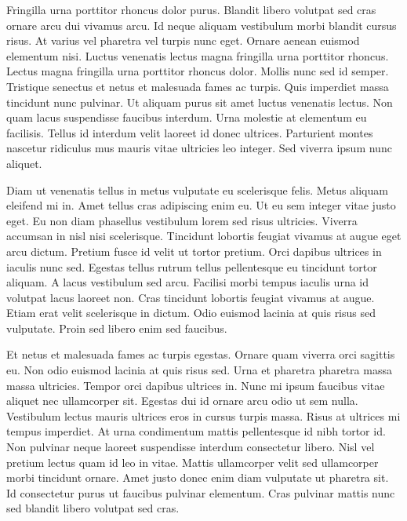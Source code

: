 \documentclass[11pt,a4paper]{article}
\begin{document}
Fringilla urna porttitor rhoncus dolor purus. Blandit libero volutpat sed cras ornare arcu dui vivamus arcu. Id neque aliquam vestibulum morbi blandit cursus risus. At varius vel pharetra vel turpis nunc eget. Ornare aenean euismod elementum nisi. Luctus venenatis lectus magna fringilla urna porttitor rhoncus. Lectus magna fringilla urna porttitor rhoncus dolor. Mollis nunc sed id semper. Tristique senectus et netus et malesuada fames ac turpis. Quis imperdiet massa tincidunt nunc pulvinar. Ut aliquam purus sit amet luctus venenatis lectus. Non quam lacus suspendisse faucibus interdum. Urna molestie at elementum eu facilisis. Tellus id interdum velit laoreet id donec ultrices. Parturient montes nascetur ridiculus mus mauris vitae ultricies leo integer. Sed viverra ipsum nunc aliquet.

Diam ut venenatis tellus in metus vulputate eu scelerisque felis. Metus aliquam eleifend mi in. Amet tellus cras adipiscing enim eu. Ut eu sem integer vitae justo eget. Eu non diam phasellus vestibulum lorem sed risus ultricies. Viverra accumsan in nisl nisi scelerisque. Tincidunt lobortis feugiat vivamus at augue eget arcu dictum. Pretium fusce id velit ut tortor pretium. Orci dapibus ultrices in iaculis nunc sed. Egestas tellus rutrum tellus pellentesque eu tincidunt tortor aliquam. A lacus vestibulum sed arcu. Facilisi morbi tempus iaculis urna id volutpat lacus laoreet non. Cras tincidunt lobortis feugiat vivamus at augue. Etiam erat velit scelerisque in dictum. Odio euismod lacinia at quis risus sed vulputate. Proin sed libero enim sed faucibus.

Et netus et malesuada fames ac turpis egestas. Ornare quam viverra orci sagittis eu. Non odio euismod lacinia at quis risus sed. Urna et pharetra pharetra massa massa ultricies. Tempor orci dapibus ultrices in. Nunc mi ipsum faucibus vitae aliquet nec ullamcorper sit. Egestas dui id ornare arcu odio ut sem nulla. Vestibulum lectus mauris ultrices eros in cursus turpis massa. Risus at ultrices mi tempus imperdiet. At urna condimentum mattis pellentesque id nibh tortor id. Non pulvinar neque laoreet suspendisse interdum consectetur libero. Nisl vel pretium lectus quam id leo in vitae. Mattis ullamcorper velit sed ullamcorper morbi tincidunt ornare. Amet justo donec enim diam vulputate ut pharetra sit. Id consectetur purus ut faucibus pulvinar elementum. Cras pulvinar mattis nunc sed blandit libero volutpat sed cras.
\end{document}
